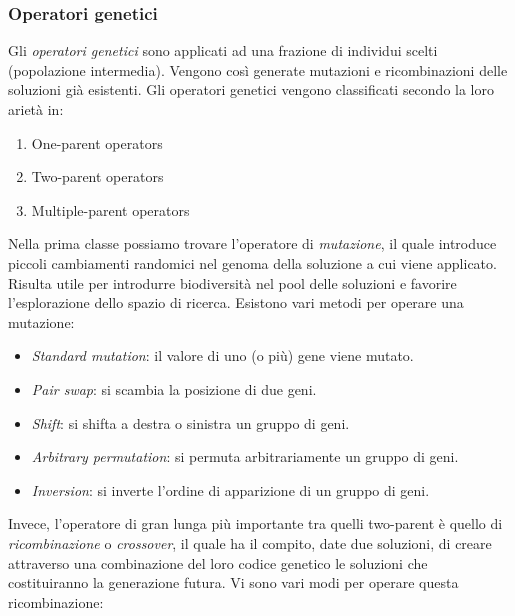 \documentclass[10pt,a4paper]{article}
\begin{document}
\subsubsection{Operatori genetici}

Gli \emph{operatori genetici} sono applicati ad una frazione di individui scelti (popolazione intermedia). Vengono così generate mutazioni e ricombinazioni delle soluzioni già esistenti. Gli operatori genetici vengono classificati secondo la loro arietà in:

\begin{enumerate}
\item{One-parent operators}
\item{Two-parent operators}
\item{Multiple-parent operators}
\end{enumerate}

Nella prima classe possiamo trovare l'operatore di \emph{mutazione}, il quale introduce piccoli cambiamenti randomici nel genoma della soluzione a cui viene applicato. Risulta utile per introdurre biodiversità nel pool delle soluzioni e favorire l'esplorazione dello spazio di ricerca. Esistono vari metodi per operare una mutazione:

\begin{itemize}
\item{\emph{Standard mutation}: il valore di uno (o più) gene viene mutato.}
\item{\emph{Pair swap}: si scambia la posizione di due geni.}
\item{\emph{Shift}: si shifta a destra o sinistra un gruppo di geni.}
\item{\emph{Arbitrary permutation}: si permuta arbitrariamente un gruppo di geni.}
\item{\emph{Inversion}: si inverte l'ordine di apparizione di un gruppo di geni.}
\end{itemize}

Invece, l'operatore di gran lunga più importante tra quelli two-parent è quello di \emph{ricombinazione} o \emph{crossover}, il quale ha il compito, date due soluzioni, di creare attraverso una combinazione del loro codice genetico le soluzioni che costituiranno la generazione futura. Vi sono vari modi per operare questa ricombinazione:
\end{document}
